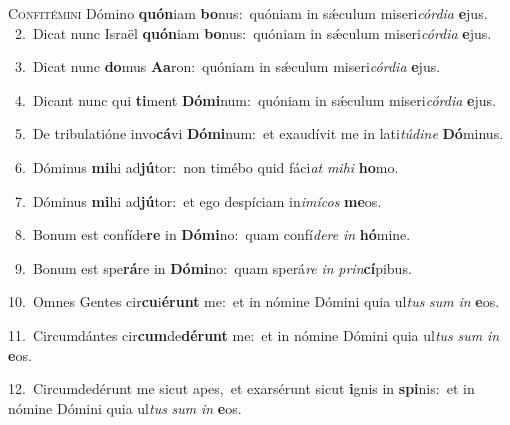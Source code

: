 \lettrine{\initial\textcolor{\initialcolor}{C}}{onfitémini} Dómino \textbf{quón}\-iam \textbf{bo}\-nus:~\star quóniam in sǽculum miseri\-\textit{cór}\-\textit{di}\textit{a} \textbf{e}\-jus.\\
{\numbfont\textcolor{\numbcolor}{~2.}}~Dicat nunc Israël \textbf{quón}\-iam \textbf{bo}\-nus:~\star quóniam in sǽculum miseri\-\textit{cór}\-\textit{di}\textit{a} \textbf{e}\-jus.\par
{\numbfont\textcolor{\numbcolor}{~3.}}~Dicat nunc \textbf{do}\-mus \textbf{A}\-\textbf{a}ron:~\star quóniam in sǽculum miseri\-\textit{cór}\-\textit{di}\textit{a} \textbf{e}\-jus.\par
{\numbfont\textcolor{\numbcolor}{~4.}}~Dicant nunc qui \textbf{ti}\-ment \textbf{Dó}\-\textbf{mi}num:~\star quóniam in sǽculum miseri\-\textit{cór}\-\textit{di}\textit{a} \textbf{e}\-jus.\par
{\numbfont\textcolor{\numbcolor}{~5.}}~De tribulatióne invo\-\textbf{cá}\-vi \textbf{Dó}\-\textbf{mi}num:~\star et exaudívit me in lati\-\textit{tú}\-\textit{di}\textit{ne} \textbf{Dó}\-minus.\par
{\numbfont\textcolor{\numbcolor}{~6.}}~Dóminus \textbf{mi}\-hi ad\-\textbf{jú}\-tor:~\star non timébo quid fáci\textit{at} \textit{mi}\-\textit{hi} \textbf{ho}\-mo.\par
{\numbfont\textcolor{\numbcolor}{~7.}}~Dóminus \textbf{mi}\-hi ad\-\textbf{jú}\-tor:~\star et ego despíciam in\-\textit{i}\-\textit{mí}\textit{cos} \textbf{me}\-os.\par
{\numbfont\textcolor{\numbcolor}{~8.}}~Bonum est confíde\textbf{re} in \textbf{Dó}\-\textbf{mi}no:~\star quam confí\-\textit{de}\-\textit{re} \textit{in} \textbf{hó}\-mine.\par
{\numbfont\textcolor{\numbcolor}{~9.}}~Bonum est spe\-\textbf{rá}\-re in \textbf{Dó}\-\textbf{mi}no:~\star quam sperá\textit{re} \textit{in} \textit{prin}\-\textbf{cí}pibus.\par
{\numbfont\textcolor{\numbcolor}{10.}}~Omnes Gentes cir\-\textbf{cu}\-i\-\textbf{é}\-\textbf{runt} me:~\star et in nómine Dómini quia ul\textit{tus} \textit{sum} \textit{in} \textbf{e}\-os.\par
{\numbfont\textcolor{\numbcolor}{11.}}~Circumdántes cir\-\textbf{cum}\-de\-\textbf{dé}\-\textbf{runt} me:~\star et in nómine Dómini quia ul\textit{tus} \textit{sum} \textit{in} \textbf{e}\-os.\par
{\numbfont\textcolor{\numbcolor}{12.}}~Circumdedérunt me sicut apes,~\dagger et exarsérunt sicut \textbf{i}\-gnis in \textbf{spi}\-nis:~\star et in nómine Dómini quia ul\textit{tus} \textit{sum} \textit{in} \textbf{e}\-os.\par
